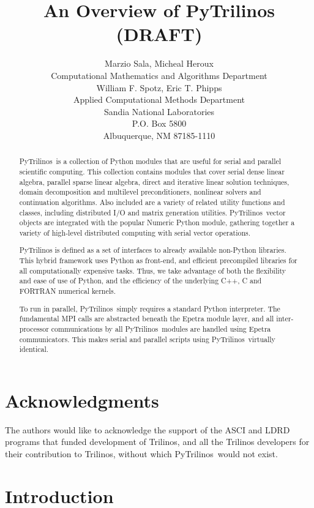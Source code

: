 \documentclass[10pt,relax]{SANDreport}
\author{Marzio Sala, Micheal Heroux\\
Computational Mathematics and Algorithms Department \\ [10pt]
William F. Spotz, Eric T. Phipps \\
Applied Computational Methods Department \\ [10pt]
Sandia National Laboratories \\
P.O. Box 5800 \\
Albuquerque, NM 87185-1110 \\
}
\title{An Overview of PyTrilinos (DRAFT)}
\newcommand{\PyTrilinos}{{PyTrilinos}}
\begin{document}
\maketitle

\begin{abstract}
\PyTrilinos\ is a collection of Python modules that are useful for
serial and parallel scientific computing. This collection contains
modules that cover serial dense linear algebra, parallel sparse linear
algebra, direct and iterative linear solution techniques, domain
decomposition and multilevel preconditioners, nonlinear solvers and
continuation algorithms. Also included are a variety of related
utility functions and classes, including distributed I/O and matrix generation
utilities.
\PyTrilinos\ vector objects are integrated with the popular Numeric
Python module, gathering together a variety of high-level distributed
computing with serial vector operations.

PyTrilinos is defined as a set of interfaces to already available non-Python
libraries.
This hybrid framework uses Python as front-end, and
efficient precompiled libraries for all computationally expensive tasks. Thus,
we take advantage of both the flexibility and ease of use of Python,
and the efficiency of the underlying C++, C and FORTRAN numerical
kernels.

To run in parallel, \PyTrilinos\ simply requires a standard Python
interpreter.  The fundamental MPI calls are abstracted beneath the
Epetra module layer, and all inter-processor communications by all
\PyTrilinos\ modules are handled using Epetra communicators. This
makes serial and parallel scripts using \PyTrilinos\ virtually
identical.
\end{abstract}

\clearpage
\section*{Acknowledgments}
The authors would like to acknowledge the support of the ASCI and LDRD
programs that funded development of Trilinos, and all the Trilinos
developers for their contribution to Trilinos, without which
\PyTrilinos\ would not exist.

\medskip

\SANDmain
\tableofcontents
\newpage

\section{Introduction}
\label{sec:intro}
\end{document}
